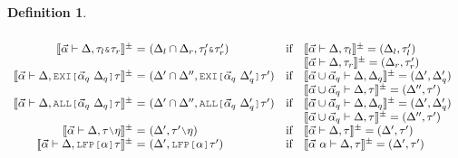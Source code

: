 \documentclass[acmsmall]{acmart}
\theoremstyle{definition}
\newtheorem{definition}{Definition}[section]
\begin{document}
\begin{definition}
\[\begin{array}[t]{r@{}c@{}lcl}
      \\

      \llbracket \vec{\alpha} \entails \Delta, \tau_l\J{\&}\tau_r \rrbracket^\pm 
      &\ =\ & 
      (\Delta_l \cap \Delta_r, \tau_l'\J{\&}\tau_r')
      &\text{if}& 
      \begin{array}[t]{@{}l}
        \llbracket \vec{\alpha} \entails \Delta, \tau_l \rrbracket^\pm = (\Delta_l, \tau_l')
        \\
        \llbracket \vec{\alpha} \entails \Delta, \tau_r \rrbracket^{\pm} = (\Delta_r, \tau_r')
      \end{array}

      \\

      \llbracket \vec{\alpha} \entails \Delta, \J{EXI[}\vec{\alpha}_q\ \Delta_q \J{]} \tau \rrbracket^\pm 
      &\ =\ & 
      (\Delta' \cap \Delta'', \J{EXI[}\vec{\alpha}_q\ \Delta_q' \J{]}\tau')
      &\text{if}& 
      \begin{array}[t]{@{}l}
        \llbracket \vec{\alpha} \cup \vec{\alpha}_q \entails \Delta, \Delta_q \rrbracket^\pm = (\Delta', \Delta_q')
        \\
        \llbracket \vec{\alpha} \cup \vec{\alpha}_q \entails \Delta, \tau \rrbracket^{\pm} = (\Delta'', \tau')
      \end{array}

      \\

      \llbracket \vec{\alpha} \entails \Delta, \J{ALL[}\vec{\alpha}_q\ \Delta_q \J{]} \tau \rrbracket^\pm 
      &\ =\ & 
      (\Delta' \cap \Delta'', \J{ALL[}\vec{\alpha}_q\ \Delta_q' \J{]}\tau')
      &\text{if}& 
      \begin{array}[t]{@{}l}
        \llbracket \vec{\alpha} \cup \vec{\alpha}_q \entails \Delta, \Delta_q \rrbracket^\pm = (\Delta', \Delta_q')
        \\
        \llbracket \vec{\alpha} \cup \vec{\alpha}_q \entails \Delta, \tau \rrbracket^{\pm} = (\Delta'', \tau')
      \end{array}

      \\

      \llbracket \vec{\alpha} \entails \Delta, \tau \typdiff \eta \rrbracket^\pm 
      &\ =\ & 
      (\Delta', \tau' \typdiff \eta)
      &\text{if}& 
      \llbracket \vec{\alpha} \entails \Delta, \tau \rrbracket^\pm = (\Delta', \tau')

      \\

      \llbracket \vec{\alpha} \entails \Delta, \J{LFP[}\alpha \J{]} \tau \rrbracket^\pm 
      &\ =\ & 
      (\Delta', \J{LFP[}\alpha \J{]}\tau')
      &\text{if}& 
      \llbracket \vec{\alpha}\ \alpha \entails \Delta, \tau \rrbracket^{\pm} = (\Delta', \tau')
      \\
  \end{array}
  \]
\end{definition}
\end{document}
